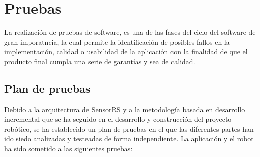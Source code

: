 

\newpage


\chapter{ Pruebas }
\label{chap:pruebas}

La realización de pruebas de software, es una de las fases del ciclo del software de gran imporatncia, la cual permite la identificación de posibles fallos en la implementación, 
calidad o usabilidad de la aplicación con la finalidad de que el producto final cumpla una serie de garantías y sea de calidad.\\

\section{Plan de pruebas}

Debido a la arquitectura de SensorRS y a la metodología basada en desarrollo incremental que se ha seguido en el desarrollo y construcción del proyecto robótico,
se ha establecido un plan de pruebas en el que las diferentes partes han ido siedo analizadas y testeadas de forma independiente. La aplicación y el robot ha sido sometido 
a las siguientes pruebas:\\


